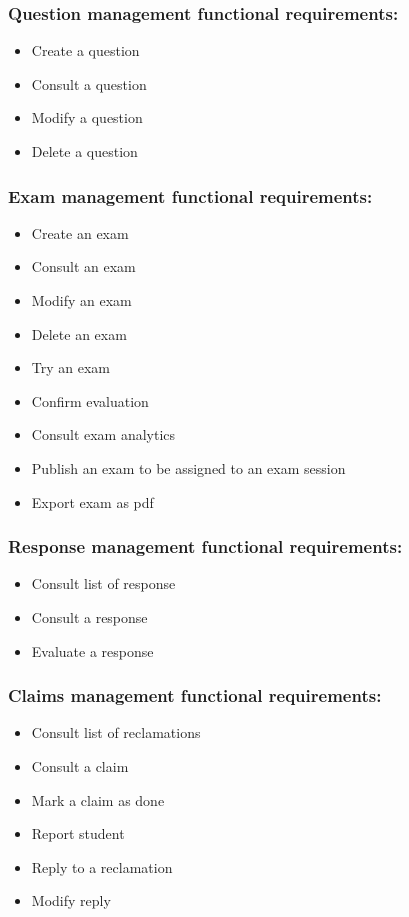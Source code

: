 \documentclass[a4paper,12p]{article}
\begin{document}
        \subsubsection{Question management functional requirements:}
        \begin{itemize}
            \item Create a question
            \item Consult a question
            \item Modify a question
            \item Delete a question
        \end{itemize}

        \subsubsection{Exam management functional requirements:}
        \begin{itemize}
            \item Create an exam
            \item Consult an exam
            \item Modify an exam
            \item Delete an exam
            \item Try an exam
            \item Confirm evaluation
            \item Consult exam analytics
            \item Publish an exam to be assigned to an exam session
            \item Export exam as pdf
        \end{itemize}

        \subsubsection{Response management functional requirements:}
        \begin{itemize}
            \item Consult list of response
            \item Consult a response
            \item Evaluate a response
        \end{itemize}

        \subsubsection{Claims management functional requirements:}
        \begin{itemize}
            \item Consult list of reclamations
            \item Consult a claim
            \item Mark a claim as done
            \item Report student
            \item Reply to a reclamation
            \item Modify reply
        \end{itemize}
\end{document}

